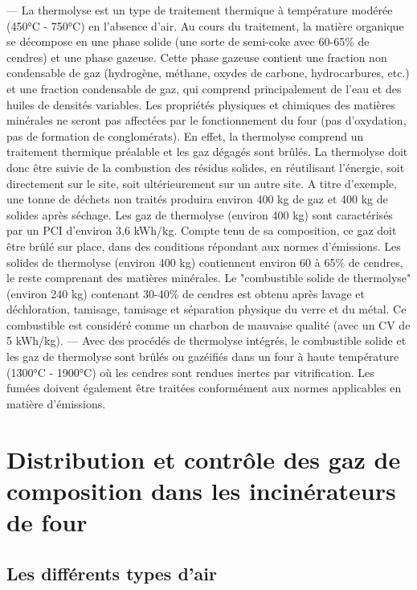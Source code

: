 \vspace{0.3cm}
— La thermolyse est un type de traitement thermique à température modérée (450°C - 750°C) en l'absence d'air. Au cours du traitement, la matière organique se décompose en une phase solide (une sorte de semi-coke avec 60-65\% de cendres) et une phase gazeuse. Cette phase gazeuse contient une fraction non condensable de gaz (hydrogène, méthane, oxydes de carbone, hydrocarbures, etc.) et une fraction condensable de gaz, qui comprend principalement de l'eau et des huiles de densités variables. Les propriétés physiques et chimiques des matières minérales ne seront pas affectées par le fonctionnement du four (pas d'oxydation, pas de formation de conglomérats).
En effet, la thermolyse comprend un traitement thermique préalable et les gaz dégagés sont brûlés. La thermolyse doit donc être suivie de la combustion des résidus solides, en réutilisant l'énergie, soit directement sur le site, soit ultérieurement sur un autre site.
\vspace{0.3cm}
A titre d'exemple, une tonne de déchets non traités produira environ 400 kg de gaz et 400 kg de solides après séchage.
Les gaz de thermolyse (environ 400 kg) sont caractérisés par un PCI d'environ 3,6 kWh/kg.
\vspace{0.3cm}
Compte tenu de sa composition, ce gaz doit être brûlé sur place, dans des conditions répondant aux normes d'émissions.
Les solides de thermolyse (environ 400 kg) contiennent environ 60 à 65\% de cendres, le reste comprenant des matières minérales. Le "combustible solide de thermolyse" (environ 240 kg) contenant 30-40\% de cendres est obtenu après lavage et déchloration, tamisage, tamisage et séparation physique du verre et du métal. Ce combustible est considéré comme un charbon de mauvaise qualité (avec un CV de 5 kWh/kg).
\vspace{0.3cm}
— Avec des procédés de thermolyse intégrés, le combustible solide et les gaz de thermolyse sont brûlés ou gazéifiés dans un four à haute température (1300°C - 1900°C) où les cendres sont rendues inertes par vitrification. Les fumées doivent également être traitées conformément aux normes applicables en matière d'émissions.



\section{Distribution et contrôle des gaz de composition dans les incinérateurs de four}


\subsection{Les différents types d'air}


